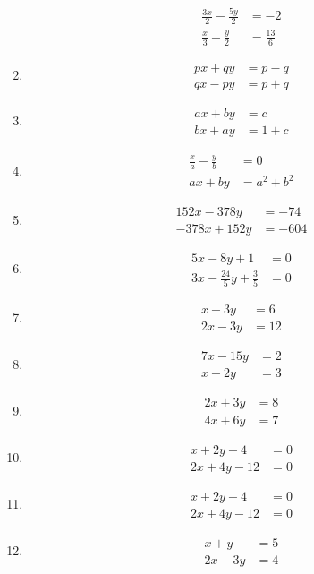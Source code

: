 \begin{multicols}{2}
\begin{enumerate}[label=\thesubsection.\arabic*,ref=\thesubsection.\theenumi]
	\begin{align*}
    	\frac{3x}{2}-\frac{5y}{2}&=-2\\ \frac{x}{3}+\frac{y}{2}&=\frac{13}{6}
    	\end{align*}
\item
\begin{align*}
px+qy&=p-q\\ qx-py&=p+q
\end{align*}
\item
\begin{align*}                                                   
ax+by&=c\\ bx+ay&=1+c
\end{align*}
\item 
\begin{align*}
\frac {x}{a}-\frac{y}{b}&=0\\ ax+by&=a^2+b^2
\end{align*}
\item
\begin{align*}
152x-378y&=-74\\ -378x+152y&=-604
\end{align*}
\item
	\begin{align*}
5x-8y+1 &= 0 \\ 3x-\frac{24}{5}y+\frac{3}{5} &= 0
\end{align*}
\item 
	\begin{align*}
x+3y &= 6 \\  2x-3y &= 12
\end{align*}
\item 
	\begin{align*}
7x-15y &= 2 \\  x+2y &= 3
\end{align*}
\item 
\begin{align*}
2x+3y &= 8 \\ 4x+6y &= 7
\end{align*}
\item \begin{align*}x+2y-4&=0\\2x+4y-12&=0\end{align*}
\item \begin{align*}x+2y-4&=0\\2x+4y-12&=0\end{align*}
\item \begin{align*}x+y&=5\\2x-3y&=4\end{align*}

\end{enumerate}
\end{multicols}
